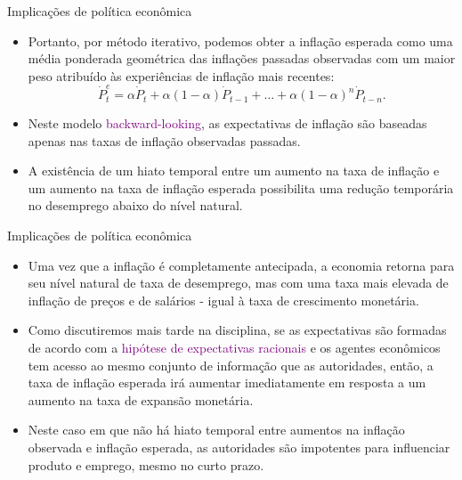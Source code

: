 \documentclass[10pt]{beamer}
\begin{document}
\begin{frame}{Implicações de política econômica}
    \begin{itemize}
        \item Portanto, por método iterativo, podemos obter a inflação esperada como uma média ponderada geométrica das inflações passadas observadas com um maior peso atribuído às experiências de inflação mais recentes:
        \begin{equation}
            \dot{P}_t^e = \alpha \dot{P}_t + \alpha(1-\alpha)\dot{P}_{t-1} + \dots + \alpha(1-\alpha)^n\dot{P}_{t-n}.
            \label{eq4}
        \end{equation}
        \bigskip
        \item Neste modelo \textcolor{purple}{backward-looking}, as expectativas de inflação são baseadas apenas nas taxas de inflação observadas passadas.
        \bigskip
        \item A existência de um hiato temporal entre um aumento na taxa de inflação e um aumento na taxa de inflação esperada possibilita uma redução temporária no desemprego abaixo do nível natural.
    \end{itemize}    
\end{frame}

\begin{frame}{Implicações de política econômica}
    \begin{itemize}
        \item Uma vez que a inflação é completamente antecipada, a economia retorna para seu nível natural de taxa de desemprego, mas com uma taxa mais elevada de inflação de preços e de salários - igual à taxa de crescimento monetária.
        \bigskip
        \item Como discutiremos mais tarde na disciplina, se as expectativas são formadas de acordo com a \textcolor{purple}{hipótese de expectativas racionais} e os agentes econômicos tem acesso ao mesmo conjunto de informação que as autoridades, então, a taxa de inflação esperada irá aumentar imediatamente em resposta a um aumento na taxa de expansão monetária.
        \bigskip
        \item Neste caso em que não há hiato temporal entre aumentos na inflação observada e inflação esperada, as autoridades são impotentes para influenciar produto e emprego, mesmo no curto prazo.
    \end{itemize}    
\end{frame}
\end{document}
